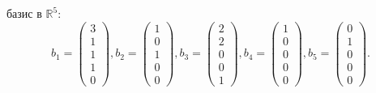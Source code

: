 \documentclass[12pt]{article}
\begin{document}
    базис в $\mathbb{R}^5$:
    \[
        b_1 = \begin{pmatrix}
                  3 \\ 1 \\ 1 \\ 1 \\ 0
        \end{pmatrix},
        b_2 = \begin{pmatrix}
                  1 \\ 0 \\ 1 \\ 0 \\ 0
        \end{pmatrix},
        b_3 = \begin{pmatrix}
                  2 \\ 2 \\ 0 \\ 0 \\ 1
        \end{pmatrix},
        b_4 = \begin{pmatrix}
                  1 \\ 0 \\ 0 \\ 0 \\ 0
        \end{pmatrix},
        b_5 = \begin{pmatrix}
                  0 \\ 1 \\ 0 \\ 0 \\ 0
        \end{pmatrix}.
    \]
\end{document}

